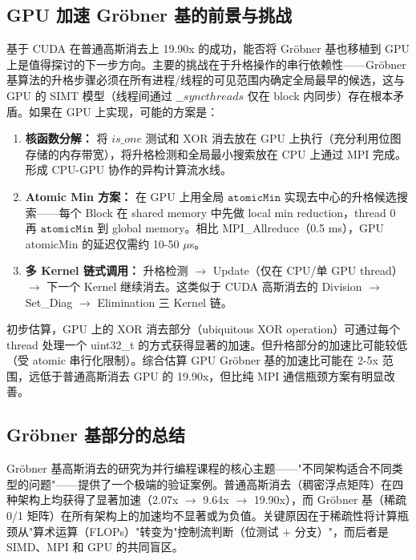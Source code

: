 \documentclass[a4paper]{article}
\begin{document}
\subsection{GPU 加速 Gröbner 基的前景与挑战}

基于 CUDA 在普通高斯消去上 19.90x 的成功，能否将 Gröbner 基也移植到 GPU 上是值得探讨的下一步方向。主要的挑战在于升格操作的串行依赖性——Gröbner 基算法的升格步骤必须在所有进程/线程的可见范围内确定全局最早的候选，这与 GPU 的 SIMT 模型（线程间通过 $\_\_syncthreads$ 仅在 block 内同步）存在根本矛盾。如果在 GPU 上实现，可能的方案是：

\begin{enumerate}
    \item \textbf{核函数分解：} 将 $is\_one$ 测试和 XOR 消去放在 GPU 上执行（充分利用位图存储的内存带宽），将升格检测和全局最小搜索放在 CPU 上通过 MPI 完成。形成 CPU-GPU 协作的异构计算流水线。
    \item \textbf{Atomic Min 方案：} 在 GPU 上用全局 $\texttt{atomicMin}$ 实现去中心的升格候选搜索——每个 Block 在 shared memory 中先做 local min reduction，thread 0 再 $\texttt{atomicMin}$ 到 global memory。相比 MPI\_Allreduce（0.5 ms），GPU atomicMin 的延迟仅需约 10-50 $\mu$s。
    \item \textbf{多 Kernel 链式调用：} 升格检测 $\rightarrow$ Update（仅在 CPU/单 GPU thread）$\rightarrow$ 下一个 Kernel 继续消去。这类似于 CUDA 高斯消去的 Division $\rightarrow$ Set\_Diag $\rightarrow$ Elimination 三 Kernel 链。
\end{enumerate}

初步估算，GPU 上的 XOR 消去部分（ubiquitous XOR operation）可通过每个 thread 处理一个 uint32\_t 的方式获得显著的加速。但升格部分的加速比可能较低（受 atomic 串行化限制）。综合估算 GPU Gröbner 基的加速比可能在 2-5x 范围，远低于普通高斯消去 GPU 的 19.90x，但比纯 MPI 通信瓶颈方案有明显改善。

\subsection{Gröbner 基部分的总结}

Gröbner 基高斯消去的研究为并行编程课程的核心主题——"不同架构适合不同类型的问题"——提供了一个极端的验证案例。普通高斯消去（稠密浮点矩阵）在四种架构上均获得了显著加速（2.07x $\rightarrow$ 9.64x $\rightarrow$ 19.90x），而 Gröbner 基（稀疏 0/1 矩阵）在所有架构上的加速均不显著或为负值。关键原因在于稀疏性将计算瓶颈从"算术运算（FLOPs）"转变为"控制流判断（位测试 + 分支）"，而后者是 SIMD、MPI 和 GPU 的共同盲区。
\end{document}
